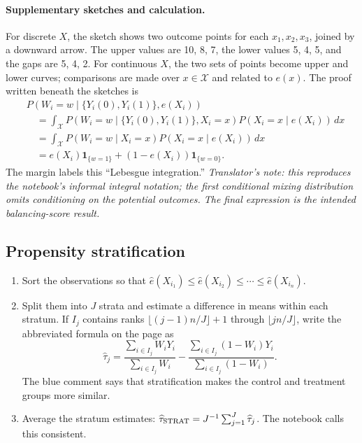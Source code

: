 \paragraph{Supplementary sketches and calculation.}
For discrete $X$, the sketch shows two outcome points for each $x_1,x_2,x_3$, joined by a downward arrow. The upper values are 10, 8, 7, the lower values 5, 4, 5, and the gaps are 5, 4, 2. For continuous $X$, the two sets of points become upper and lower curves; comparisons are made over $x\in\mathcal X$ and related to $e(x)$.
The proof written beneath the sketches is
\begin{align*}
&P(W_i=w\mid\{Y_i(0),Y_i(1)\},e(X_i))\\
&\quad=\int_{\mathcal X}P(W_i=w\mid\{Y_i(0),Y_i(1)\},X_i=x)
 P(X_i=x\mid e(X_i))\,dx\\
&\quad=\int_{\mathcal X}P(W_i=w\mid X_i=x)P(X_i=x\mid e(X_i))\,dx\\
&\quad=e(X_i)\mathbf1_{\{w=1\}}+(1-e(X_i))\mathbf1_{\{w=0\}}.
\end{align*}
The margin labels this ``Lebesgue integration.''
\textit{Translator's note: this reproduces the notebook's informal integral notation; the first conditional mixing distribution omits conditioning on the potential outcomes. The final expression is the intended balancing-score result.}
\subsection{Propensity stratification}
\begin{enumerate}
\item Sort the observations so that $\widehat e(X_{i_1})\leq\widehat e(X_{i_2})\leq\cdots\leq\widehat e(X_{i_n})$.
\item Split them into $J$ strata and estimate a difference in means within each stratum. If $I_j$ contains ranks $\lfloor(j-1)n/J\rfloor+1$ through $\lfloor jn/J\rfloor$, write the abbreviated formula on the page as
\[
\widehat\tau_j=\frac{\sum_{i\in I_j}W_iY_i}{\sum_{i\in I_j}W_i}
-\frac{\sum_{i\in I_j}(1-W_i)Y_i}{\sum_{i\in I_j}(1-W_i)}.
\]
The blue comment says that stratification makes the control and treatment groups more similar.
\item Average the stratum estimates: $\widehat\tau_{\rm STRAT}=J^{-1}\sum_{j=1}^J\widehat\tau_j$. The notebook calls this consistent.
\end{enumerate}
